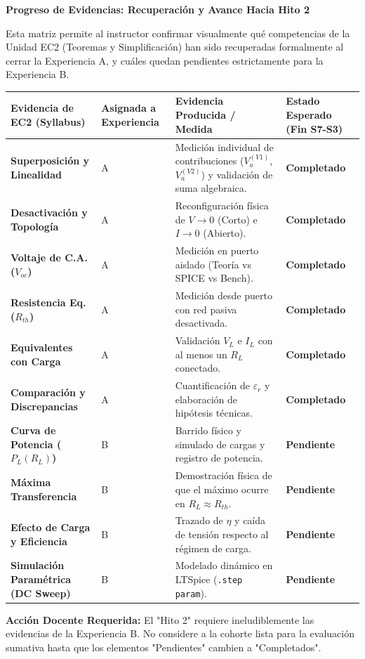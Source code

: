 \documentclass[11pt, a4paper]{article}
\begin{document}
\begin{tcolorbox}[colback=ucbblue!5!white, colframe=ucbblue, title=\textbf{Matriz de Trazabilidad y Estado de EC2}]
    \centering \textbf{Progreso de Evidencias: Recuperación y Avance Hacia Hito 2}
\end{tcolorbox}

\noindent Esta matriz permite al instructor confirmar visualmente qué competencias de la Unidad EC2 (Teoremas y Simplificación) han sido recuperadas formalmente al cerrar la Experiencia A, y cuáles quedan pendientes estrictamente para la Experiencia B.

\vspace{0.4cm}
\renewcommand{\arraystretch}{1.8}
\noindent
\begin{tabularx}{\textwidth}{|>{\RaggedRight\bfseries}p{3.5cm}|>{\centering\arraybackslash}p{2cm}|>{\RaggedRight\arraybackslash}X|>{\bfseries\centering\arraybackslash}p{2.5cm}|}
\hline
\rowcolor{ucbblue!10}
\textbf{Evidencia de EC2 (Syllabus)} & \textbf{Asignada a Experiencia} & \textbf{Evidencia Producida / Medida} & \textbf{Estado Esperado (Fin S7-S3)} \\ \hline
Superposición y Linealidad & A & Medición individual de contribuciones ($V_a^{(V1)}$, $V_a^{(V2)}$) y validación de suma algebraica. & \cellcolor{green!20}Completado \\ \hline
Desactivación y Topología & A & Reconfiguración física de $V \rightarrow 0$ (Corto) e $I \rightarrow 0$ (Abierto). & \cellcolor{green!20}Completado \\ \hline
Voltaje de C.A. ($V_{oc}$) & A & Medición en puerto aislado (Teoría vs SPICE vs Bench). & \cellcolor{green!20}Completado \\ \hline
Resistencia Eq. ($R_{th}$) & A & Medición desde puerto con red pasiva desactivada. & \cellcolor{green!20}Completado \\ \hline
Equivalentes con Carga & A & Validación $V_L$ e $I_L$ con al menos un $R_L$ conectado. & \cellcolor{green!20}Completado \\ \hline
Comparación y Discrepancias & A & Cuantificación de $\varepsilon_r$ y elaboración de hipótesis técnicas. & \cellcolor{green!20}Completado \\ \hline
\rowcolor{gray!10}
Curva de Potencia ($P_L(R_L)$) & B & Barrido físico y simulado de cargas y registro de potencia. & \cellcolor{yellow!20}Pendiente \\ \hline
\rowcolor{gray!10}
Máxima Transferencia & B & Demostración física de que el máximo ocurre en $R_L \approx R_{th}$. & \cellcolor{yellow!20}Pendiente \\ \hline
\rowcolor{gray!10}
Efecto de Carga y Eficiencia & B & Trazado de $\eta$ y caída de tensión respecto al régimen de carga. & \cellcolor{yellow!20}Pendiente \\ \hline
\rowcolor{gray!10}
Simulación Paramétrica (DC Sweep) & B & Modelado dinámico en LTSpice (\texttt{.step param}). & \cellcolor{yellow!20}Pendiente \\ \hline
\end{tabularx}

\vspace{0.6cm}
\textbf{Acción Docente Requerida:} 
El "Hito 2" requiere ineludiblemente las evidencias de la Experiencia B. No considere a la cohorte lista para la evaluación sumativa hasta que los elementos "Pendientes" cambien a "Completados".
\end{document}

